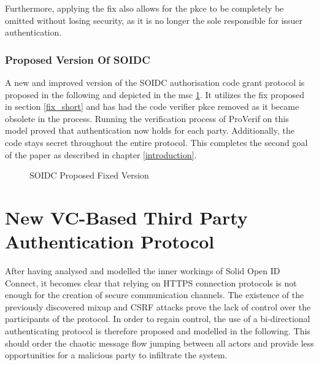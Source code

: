 \documentclass[11pt,twoside,a4paper,openright]{book}
\begin{document}
Furthermore, applying the fix also allows for the pkce to be completely be omitted without losing security, as it is no longer the sole responsible for issuer authentication. 


\subsection{Proposed Version Of SOIDC}

A new and improved version of the SOIDC authorisation code grant protocol is proposed in the following and depicted in the msc \ref{fig:msc_soidc_fix}. It utilizes the fix proposed in section \ref{fix_short} and has had the code verifier pkce removed as it became obsolete in the process. Running the verification process of ProVerif on this model proved that authentication now holds for each party. Additionally, the code stays secret throughout the entire protocol. This completes the second goal of the paper as described in chapter \ref{introduction}.

\begin{figure}[H]
    \centering
    
    \caption{SOIDC Proposed Fixed Version}
    \label{fig:msc_soidc_fix}
\end{figure}


\chapter{New VC-Based Third Party Authentication Protocol}
\label{msoidc}

After having analysed and modelled the inner workings of Solid Open ID Connect, it becomes clear that relying on HTTPS connection protocols is not enough for the creation of secure communication channels. The existence of the previously discovered mixup and CSRF attacks prove the lack of control over the participants of the protocol. In order to regain control, the use of a bi-directional authenticating protocol is therefore proposed and modelled in the following. This should order the chaotic message flow jumping between all actors and provide less opportunities for a malicious party to infiltrate the system. 
\end{document}
